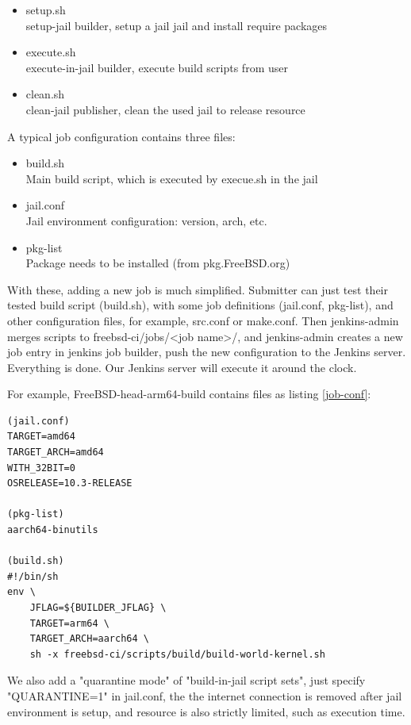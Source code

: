 \documentclass[a4paper,twocolumn,10pt]{article}
\begin{document}
\begin{itemize}
\item setup.sh\\
  setup-jail builder, setup a jail jail and install require packages
\item execute.sh\\
  execute-in-jail builder, execute build scripts from user
\item clean.sh\\
  clean-jail publisher, clean the used jail to release resource
\end{itemize}

A typical job configuration contains three files:

\begin{itemize}
\item build.sh\\
  Main build script, which is executed by execue.sh in the jail
\item jail.conf\\
  Jail environment configuration: version, arch, etc.
\item pkg-list\\
  Package needs to be installed (from pkg.FreeBSD.org)
\end{itemize}

With these, adding a new job is much simplified. Submitter can just test their
tested build script (build.sh), with some job definitions (jail.conf,
pkg-list), and other configuration files, for example, src.conf or make.conf.
Then jenkins-admin merges scripts to freebsd-ci/jobs/<job name>/, and
jenkins-admin creates a new job entry in jenkins job builder, push the new
configuration to the Jenkins server. Everything is done. Our Jenkins server
will execute it around the clock.

For example, FreeBSD-head-arm64-build contains files as listing \ref{job-conf}:

\begin{lstlisting}[captionpos=b,caption=Job configurations,label=job-conf]
(jail.conf)
TARGET=amd64
TARGET_ARCH=amd64
WITH_32BIT=0
OSRELEASE=10.3-RELEASE

(pkg-list)
aarch64-binutils

(build.sh)
#!/bin/sh
env \
	JFLAG=${BUILDER_JFLAG} \
	TARGET=arm64 \
	TARGET_ARCH=aarch64 \
	sh -x freebsd-ci/scripts/build/build-world-kernel.sh
\end{lstlisting}

We also add a "quarantine mode" of "build-in-jail script sets", just specify
"QUARANTINE=1" in jail.conf, the the internet connection is removed after jail
environment is setup, and resource is also strictly limited, such as execution
time.
\end{document}
